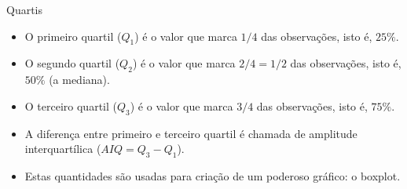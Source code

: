 \documentclass[
  ignorenonframetext,
  serif,
  professionalfont,
  usenames,
  dvipsnames,
  aspectratio = 169]{beamer}
\providecommand{\tightlist}{%
  \setlength{\itemsep}{0pt}\setlength{\parskip}{0pt}}
\renewcommand{\tightlist}{%
  \setlength{\itemsep}{0\baselineskip}
  \setlength{\parskip}{0.25\baselineskip}
}
\begin{document}
\begin{frame}{Quartis}
\protect\hypertarget{quartis-1}{}
\begin{itemize}
\tightlist
\item
  O primeiro quartil (\(Q_1\)) é o valor que marca \(1/4\) das
  observações, isto é, \(25\%\).
\item
  O segundo quartil (\(Q_2\)) é o valor que marca \(2/4=1/2\) das
  observações, isto é, \(50\%\) (a mediana).
\item
  O terceiro quartil (\(Q_3\)) é o valor que marca \(3/4\) das
  observações, isto é, \(75\%\).
\item
  A diferença entre primeiro e terceiro quartil é chamada de amplitude
  interquartílica (\(AIQ = Q_3-Q_1\)).
\item
  Estas quantidades são usadas para criação de um poderoso gráfico: o
  boxplot.
\end{itemize}
\end{frame}
\end{document}
